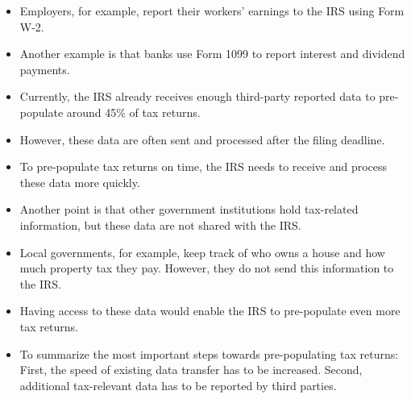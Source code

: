 \documentclass[11pt]{article}
\newcommand{\tk}[1]{\textcolor{orange}{#1}}
\begin{document}
\begin{itemize}
    \item Employers, for example, report their workers’ earnings to the IRS using Form W-2.  
    \item Another example is that banks use Form 1099 to report interest and dividend payments. 
    \item Currently, the IRS already receives enough third-party reported data to pre-populate around 45\% of tax returns. 
    \item However, these data are often sent and processed after the filing deadline.
    \item To pre-populate tax returns on time, the IRS needs to receive and process these data more quickly. 
    \item Another point is that other government institutions hold tax-related information, but these data are not shared with the IRS. 
    \item Local governments, for example, keep track of who owns a house and how much property tax they pay. However, they do not send this information to the IRS. 
    \item Having access to these data would enable the IRS to pre-populate even more tax returns. 
    \item To summarize the most important steps towards pre-populating tax returns: 
    First, the speed of existing data transfer has to be increased. Second, additional tax-relevant data has to be reported by third parties.
\end{itemize}
\end{document}
